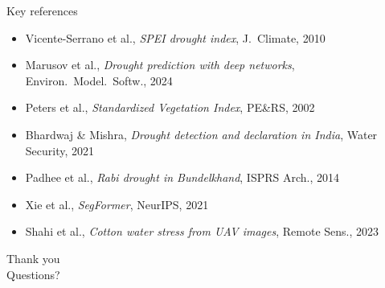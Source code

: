 \documentclass[aspectratio=169,11pt]{beamer}
\begin{document}
\begin{frame}{Key references}
  \footnotesize
  \begin{itemize}
    \item Vicente-Serrano et al., \emph{SPEI drought index}, J.\ Climate, 2010
    \item Marusov et al., \emph{Drought prediction with deep networks}, Environ.\ Model.\ Softw., 2024
    \item Peters et al., \emph{Standardized Vegetation Index}, PE\&RS, 2002
    \item Bhardwaj \& Mishra, \emph{Drought detection and declaration in India}, Water Security, 2021
    \item Padhee et al., \emph{Rabi drought in Bundelkhand}, ISPRS Arch., 2014
    \item Xie et al., \emph{SegFormer}, NeurIPS, 2021
    \item Shahi et al., \emph{Cotton water stress from UAV images}, Remote Sens., 2023
  \end{itemize}
\end{frame}

\begin{frame}[standout]
  Thank you\\[6pt]
  {\normalsize Questions?}
\end{frame}
\end{document}
